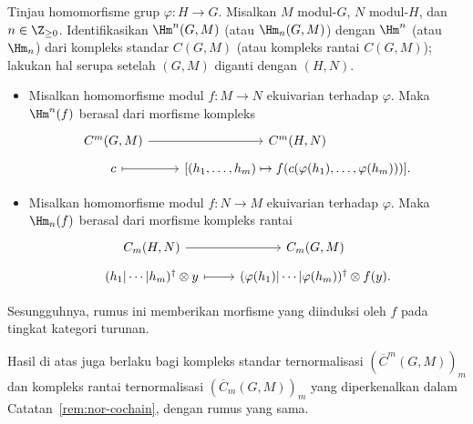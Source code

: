 \begin{proposition}\label{prop:grp-equiv}
	Tinjau homomorfisme grup $\varphi:H\to G$. Misalkan $M$ modul-$G$, $N$
	modul-$H$, dan $n\in\Z_{\geq0}$. Identifikasikan $\Hm^n(G,M)$ (atau
	$\Hm_n(G,M)$) dengan $\Hm^n$ (atau $\Hm_n$) dari kompleks standar
	$C(G,M)$ (atau kompleks rantai $C(G,M)$); lakukan hal serupa setelah
	$(G,M)$ diganti dengan $(H,N)$.

	\begin{itemize}
		\item Misalkan homomorfisme modul $f:M\to N$ ekuivarian terhadap
		$\varphi$. Maka $\Hm^n(f)$ berasal dari morfisme kompleks
		\[\begin{tikzcd}[row sep=tiny]
			C^m(G, M) \arrow[r] & C^m(H, N) \\
			c \arrow[mapsto, r] & {\left[ (h_1, \ldots, h_m) \mapsto f(c(\varphi(h_1), \ldots, \varphi(h_m))) \right]}.
		\end{tikzcd}\]
		\item Misalkan homomorfisme modul $f:N\to M$ ekuivarian terhadap
		$\varphi$. Maka $\Hm_n(f)$ berasal dari morfisme kompleks rantai
		\[\begin{tikzcd}[row sep=tiny]
			C_m(H, N) \arrow[r] & C_m(G, M) \\
			(h_1 | \cdots | h_m)^\dagger \otimes y \arrow[mapsto, r] & (\varphi(h_1) | \cdots | \varphi(h_m))^\dagger \otimes f(y).
		\end{tikzcd}\]
	\end{itemize}
	Sesungguhnya, rumus ini memberikan morfisme yang diinduksi oleh $f$ pada
	tingkat kategori turunan.

	Hasil di atas juga berlaku bagi kompleks standar ternormalisasi
	$(\overline{C}^m(G,M))_m$ dan kompleks rantai ternormalisasi
	$(\overline{C}_m(G,M))_m$ yang diperkenalkan dalam
	Catatan~\ref{rem:nor-cochain}, dengan rumus yang sama.
\end{proposition}

